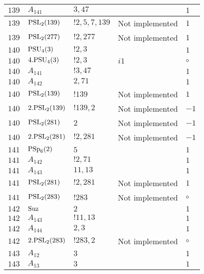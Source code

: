 \documentclass[a4paper, 11pt]{article}
\begin{document}
\begin{longtable}{lllll}
        $ 139 $ & $ A_{141} $ & $ 3, 47 $ & $ ~ $ & $ 1$ \\ \hline
        $ 139 $ & $ {\rm PSL}_{2}(139) $ & $ !2, 5, 7, 139 $ &  Not implemented & $ 1$ \\ \hline
        $ 139 $ & $ {\rm PSL}_{2}(277) $ & $ !2, 277 $ &  Not implemented & $ 1$ \\ \hline
        $ 140 $ & $ {\rm PSU}_{4}(3) $ & $ ! 2,3 $ & $ ~ $ & $ 1$ \\ \hline
        $ 140 $ & $ 4.{\rm PSU}_{4}(3) $ & $ ! 2,3 $ & $ i1 $ &  $\circ$ \\ \hline
        $ 140 $ & $ A_{141} $ & $ !3, 47 $ & $ ~ $ & $ 1$ \\ \hline
        $ 140 $ & $ A_{142} $ & $ 2, 71 $ & $ ~ $ & $ 1$ \\ \hline
        $ 140 $ & $ {\rm PSL}_{2}(139) $ & $ !139 $ &  Not implemented & $ 1$ \\ \hline
        $ 140 $ & $ 2.{\rm PSL}_{2}(139) $ & $ !139, 2 $ &  Not implemented & $ -1$ \\ \hline
        $ 140 $ & $ {\rm PSL}_{2}(281) $ & $ 2 $ &  Not implemented & $ -1$ \\ \hline
        $ 140 $ & $ 2.{\rm PSL}_{2}(281) $ & $ !2, 281 $ &  Not implemented & $ -1$ \\ \hline
        $ 141 $ & $ {\rm PSp}_{6}(2) $ & $ 5 $ & $ ~ $ & $ 1$ \\ \hline
        $ 141 $ & $ A_{142} $ & $ !2, 71 $ & $ ~ $ & $ 1$ \\ \hline
        $ 141 $ & $ A_{143} $ & $ 11, 13 $ & $ ~ $ & $ 1$ \\ \hline
        $ 141 $ & $ {\rm PSL}_{2}(281) $ & $ !2, 281 $ &  Not implemented & $ 1$ \\ \hline
        $ 141 $ & $ {\rm PSL}_{2}(283) $ & $ !283 $ &  Not implemented &  $\circ$ \\ \hline
        $ 142 $ & $ {\rm Suz} $ & $ 2 $ & $ ~ $ & $ 1$ \\ \hline
        $ 142 $ & $ A_{143} $ & $ !11, 13 $ & $ ~ $ & $ 1$ \\ \hline
        $ 142 $ & $ A_{144} $ & $ 2, 3 $ & $ ~ $ & $ 1$ \\ \hline
        $ 142 $ & $ 2.{\rm PSL}_{2}(283) $ & $ !283, 2 $ &  Not implemented &  $\circ$ \\ \hline
        $ 143 $ & $ A_{12} $ & $ 3 $ & $ ~ $ & $ 1$ \\ \hline
        $ 143 $ & $ A_{13} $ & $ 3 $ & $ ~ $ & $ 1$ \\ \hline

\end{longtable}
\end{document}
